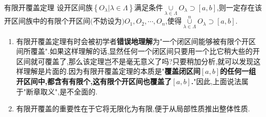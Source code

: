 \begin{theorem}{有限开覆盖定理}
	设开区间族$\left\{ O_{\lambda}|\lambda \in \varLambda \right\} $满足条件$\underset{\lambda \in \varLambda}{\cup}O_{\lambda}\supset \left[ a,b \right] $,则一定存在该开区间族中的有限个开区间$($不妨设为$)$$O_1,O_2,\cdots ,O_n$,使得$\underset{\lambda \in \varLambda}{\overset{n}{\cup}}O_{\lambda}\supset \left[ a,b \right] $.
\end{theorem}

\begin{note}
	\begin{enumerate}
		\item 有限开覆盖定理有时会被初学者\textbf{错误地理解}为"一个闭区间能够被有限个开区间所覆盖".如果这样理解的话,显然任何一个闭区间只要用一个比它稍大些的开区间就可覆盖了,那么该定理岂不是毫无意义了吗?只要稍加分析,就可以发现这样理解是片面的.因为有限开覆盖定理的本质是"\textbf{覆盖闭区间$[a,b]$的任何一组开区间中,都含有有限个,这有限个开区间也覆盖了$[a,b]$.}"因此,上面说法属于"断章取义",是不全面的.
		\item 有限开覆盖的重要性在于它将无限化为有限,便于从局部性质推出整体性质.
	\end{enumerate}
\end{note}
